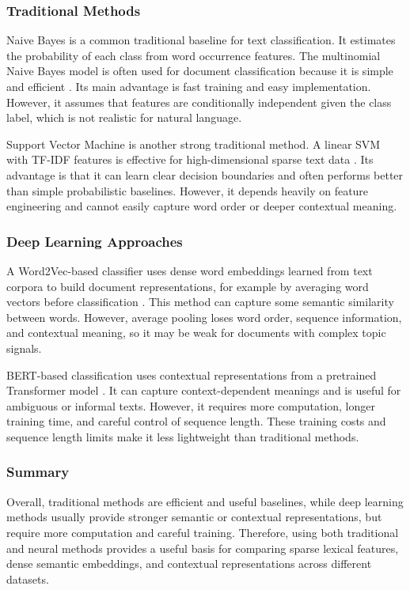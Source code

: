 \subsubsection{Traditional Methods}

Naive Bayes is a common traditional baseline for text classification. It estimates the probability of each class from word occurrence features. The multinomial Naive Bayes model is often used for document classification because it is simple and efficient \cite{mccallum1998comparison}. Its main advantage is fast training and easy implementation. However, it assumes that features are conditionally independent given the class label, which is not realistic for natural language.

Support Vector Machine is another strong traditional method. A linear SVM with TF-IDF features is effective for high-dimensional sparse text data \cite{joachims1998text}. Its advantage is that it can learn clear decision boundaries and often performs better than simple probabilistic baselines. However, it depends heavily on feature engineering and cannot easily capture word order or deeper contextual meaning.

\subsubsection{Deep Learning Approaches}

A Word2Vec-based classifier uses dense word embeddings learned from text corpora to build document representations, for example by averaging word vectors before classification \cite{mikolov2013efficient}. This method can capture some semantic similarity between words. However, average pooling loses word order, sequence information, and contextual meaning, so it may be weak for documents with complex topic signals.

BERT-based classification uses contextual representations from a pretrained Transformer model \cite{devlin2019bert}. It can capture context-dependent meanings and is useful for ambiguous or informal texts. However, it requires more computation, longer training time, and careful control of sequence length. These training costs and sequence length limits make it less lightweight than traditional methods.

\subsubsection{Summary}

Overall, traditional methods are efficient and useful baselines, while deep learning methods usually provide stronger semantic or contextual representations, but require more computation and careful training. Therefore, using both traditional and neural methods provides a useful basis for comparing sparse lexical features, dense semantic embeddings, and contextual representations across different datasets.

